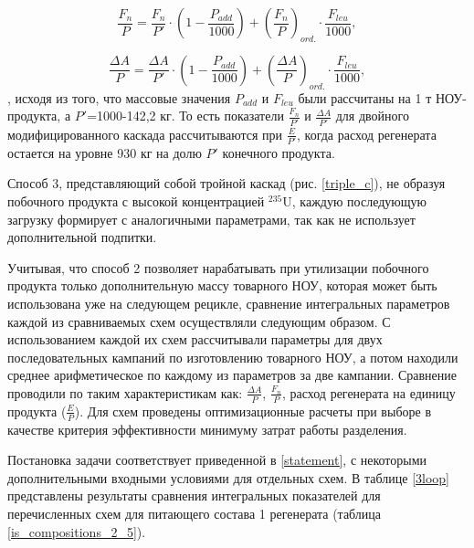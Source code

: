 \begin{equation} \label{Fnu_plus} 
    \frac{F_n}{P}=\frac{F_n}{P'}\cdot (1 - \frac{P_{add}}{1000}) + (\frac{F_n}{P})_{ord.}\cdot \frac{F_{leu}}{1000},
\end{equation} 

\begin{equation} \label{AvsP_plus} 
    \frac{\Delta A}{P}=\frac{\Delta A}{P'}\cdot (1 - \frac{P_{add}}{1000}) + (\frac{\Delta A}{P})_{ord.}\cdot \frac{F_{leu}}{1000},
\end{equation} 
, исходя из того, что массовые значения $P_{add}$ и $F_{leu}$ были рассчитаны на 1 т НОУ-продукта, а $P'$=1000-142,2 кг. То есть показатели $\frac{F_n}{P'}$ и
$\frac{\Delta A}{P'}$ для двойного модифицированного каскада рассчитываются при $\frac{E}{P'}$, когда расход регенерата остается на уровне 930 кг на долю $P'$ конечного продукта.

Способ 3, представляющий собой тройной каскад (рис. \ref{triple_c}), не образуя побочного продукта с высокой концентрацией $^{235}$U, каждую последующую загрузку формирует с аналогичными параметрами, так как не использует дополнительной подпитки.

Учитывая, что способ 2 позволяет нарабатывать при утилизации побочного продукта только дополнительную массу товарного НОУ, которая может быть использована уже на следующем рецикле, сравнение интегральных параметров каждой из сравниваемых схем осуществляли следующим образом. С использованием каждой их схем рассчитывали параметры для двух последовательных кампаний по изготовлению товарного НОУ, а потом находили среднее арифметическое по каждому из параметров за две кампании. Сравнение проводили по таким характеристикам как: $\frac{\Delta A}{P}$, $\frac{F_n}{P}$, расход регенерата на единицу продукта ($\frac{E}{P}$). Для схем проведены оптимизационные расчеты при выборе в качестве критерия эффективности минимуму затрат работы разделения.

Постановка задачи соответствует приведенной в \ref{statement}, с некоторыми дополнительными входными условиями для отдельных схем.
В таблице \ref{3loop} представлены результаты сравнения интегральных показателей для перечисленных схем для питающего состава 1 регенерата (таблица \ref{is_compositions_2_5}).

